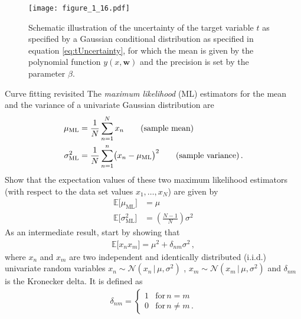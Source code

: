 \documentclass[11pt,DINA4, fleqn]{amsart}
\begin{document}
\begin{figure}[h]
	\centering
	\texttt{[image: figure\_1\_16.pdf]}
	\caption{Schematic illustration of the uncertainty of the target variable $t$ as specified by a Gaussian conditional distribution as specified in equation \eqref{eq:tUncertainty}, for which the mean is given by the polynomial function $y(x,\bm{w})$ and the precision is set by the parameter $\beta$.
		\label{fig:figure_1_16}}
\end{figure}

\begin{mybox_tc3}{Curve fitting revisited}
The \emph{maximum likelihood} (ML) estimators for the mean and the variance of a univariate Gaussian distribution are
\begin{align}
\mu_{\text{ML}} &= \dfrac{1}{N} \sum\displaylimits_{n = 1}^{N} x_n \qquad \text{(sample mean)} \\
\sigma^2_{\text{ML}} &= \dfrac{1}{N} \sum\displaylimits_{n = 1}^{n}\bigl(x_n - \mu_{\text{ML}}\bigl)^2 \qquad \text{(sample variance)} \, .
\end{align}
Show that the expectation values of these two maximum likelihood estimators (with respect to the data set values $x_1, \dots, x_N$) are given by
\begin{align}
\mathbb{E}\bigl[\mu_{\text{ML}}\bigl] &= \mu \\
\mathbb{E}\bigl[\sigma^2_{\text{ML}}\bigl] &= \left(\frac{N - 1}{N}\right) \sigma^2
\end{align}
As an intermediate result, start by showing that
\begin{align}
\mathbb{E}\bigl[x_n x_m\bigl] = \mu^2 + \delta_{nm} \sigma^2 \, ,
\label{eq:interResult}
\end{align}
where $x_n$ and $x_m$ are two independent and identically distributed (i.i.d.) univariate random variables $x_n \sim \mathcal{N}\left(x_n \,\bigl| \, \mu, \sigma^2\right)$ , $x_m\sim \mathcal{N}(x_m \, \bigl| \, \mu, \sigma^2)$ and $\delta_{nm}$ is the Kronecker delta.
It is defined as
\begin{align}
\delta_{nm} = \begin{cases}
1 & \text{for} \, n = m \\
0 & \text{for} \, n \neq m \, .
\end{cases}
\end{align}
\end{mybox_tc3}
\end{document}
